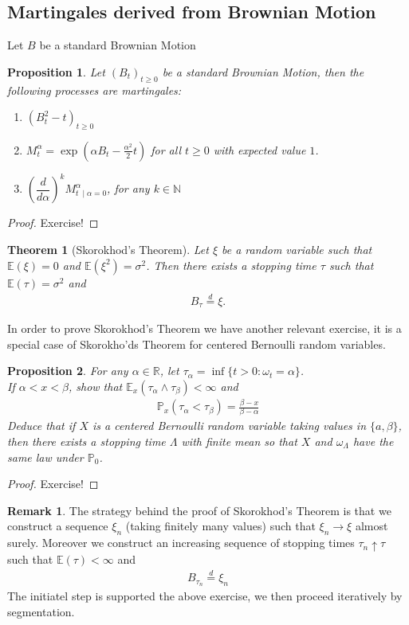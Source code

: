 \documentclass[11pt,a4paper, final]{article}
\newtheorem{thm}{Theorem}[section]
\newtheorem{prop}{Proposition}[section]
\theoremstyle{definition}
\newtheorem{rem}{Remark}[section]
\begin{document}
\subsection{Martingales derived from Brownian Motion}
Let $B$ be a standard Brownian Motion
\begin{prop} Let $(B_t)_{t \geq 0}$ be a standard Brownian Motion, then the following processes are martingales:
\begin{enumerate}
\item $(B_t^2-t)_{t \geq 0}$ 
\item $M_t^\alpha = \exp\left( \alpha B_t - \frac{\alpha^2}{2}t \right)$ for all $t \geq 0$ with expected value $1$. 
\item $\left( \dfrac{d}{d \alpha} \right)^k M_{t \ \mid \alpha =0} ^\alpha$, for any $k \in \mathbb{N}$
\end{enumerate}
\end{prop}
\begin{proof}
Exercise!
\end{proof}
\begin{thm}[Skorokhod's Theorem] Let $\xi$ be a random variable such that $\mathbb{E}( \xi)=0$ and $\mathbb{E}( \xi^2)= \sigma^2$. Then there exists a stopping time $\tau$ such that $\mathbb{E}( \tau)= \sigma^2$ and 
\begin{align*}
B_\tau \overset{d}= \xi. 
\end{align*}
\end{thm}
\noindent In order to prove Skorokhod's Theorem we have another relevant exercise, it is a special case of Skorokho'ds Theorem for centered Bernoulli random variables. 
\begin{prop} For any $\alpha \in \mathbb{R}$, let $\tau_\alpha = \inf \lbrace t >0 : \omega_t = \alpha \rbrace$. \\ If $\alpha < x < \beta$, show that $\mathbb{E}_x( \tau_\alpha \wedge \tau_\beta) < \infty$ and 
\begin{align*}
\mathbb{P}_x ( \tau_\alpha < \tau_\beta) = \frac{\beta-x}{\beta-\alpha}
\end{align*}
Deduce that if $X$ is a centered Bernoulli random variable taking values in $\lbrace a, \beta \rbrace$, then there exists a stopping time $\Lambda$ with finite mean so that $X$ and $\omega_\Lambda$ have the same law under $\mathbb{P}_0$. 
\end{prop}
\begin{proof}
Exercise!
\end{proof}
\begin{rem} The strategy behind the proof of Skorokhod's Theorem is that we construct a sequence $\xi_n$ (taking finitely many values) such that $\xi_n \to \xi$ almost surely. Moreover we construct an increasing sequence of stopping times $\tau_n \uparrow \tau$ such that $\mathbb{E}( \tau ) < \infty$ and 
\begin{align*}
B_{\tau_n} \overset{d}= \xi_n
\end{align*}
The initiatel step is supported the above exercise, we then proceed iteratively by segmentation. 
\end{rem}
\end{document}
